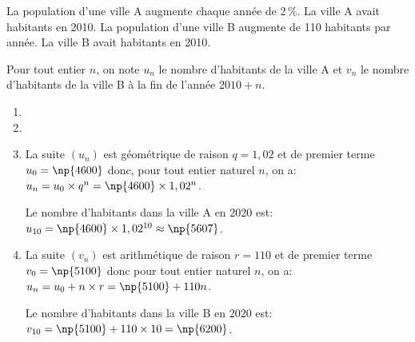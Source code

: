 \medskip

La population d'une ville A augmente chaque année de 2\,\%. 
La ville A avait  habitants en 2010.
La population d'une ville B augmente de 110 habitants par année.
La ville B avait  habitants en 2010.

Pour tout entier $n$, on note $u_n$ le nombre d'habitants de la ville A et $v_n$ le nombre d'habitants de la ville B à la fin de l'année $2010 + n$.

\medskip

\begin{enumerate}
\item
{}

\item
{}

\item 
La suite $(u_n)$ est géométrique de raison $q=1,02$ et de premier terme $u_0=\np{4600}$ donc, pour tout entier naturel $n$, on a: $u_n=u_0\times q^n = \np{4600}\times 1,02^n$.

Le nombre d'habitants dans la ville A en 2020 est: $u_{10}=\np{4600}\times 1,02^{10}\approx \np{5607}$.

\item 
La suite $(v_n)$ est arithmétique de raison $r=110$ et de premier terme $v_0=\np{5100}$ donc pour tout entier naturel $n$, on a:
$u_n=u_0 + n\times r = \np{5100} + 110n$.

Le nombre d'habitants dans la ville B en 2020 est: $v_{10}= \np{5100}+110\times 10 = \np{6200}$.


\end{enumerate}
